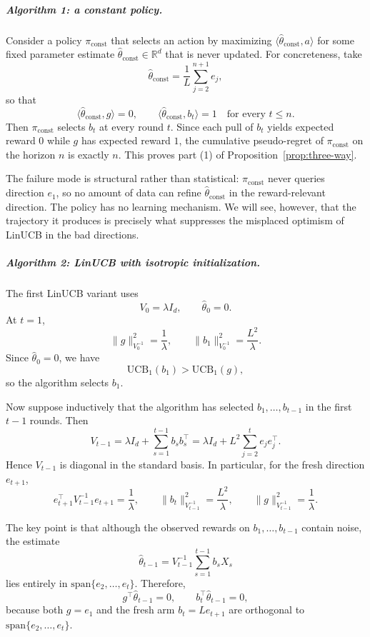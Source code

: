 \documentclass{article}
\theoremstyle{definition}
\theoremstyle{remark}
\theoremstyle{remark}
\begin{document}
\subparagraph{Algorithm 1: a constant policy.}
Consider a policy $\pi_{\mathrm{const}}$ that selects an action by maximizing $\langle \hat{\theta}_{\mathrm{const}}, a\rangle$ for some fixed parameter estimate $\hat{\theta}_{\mathrm{const}}\in\mathbb{R}^d$ that is never updated. For concreteness, take
\[
\hat{\theta}_{\mathrm{const}}
=
\frac{1}{L}\sum_{j=2}^{n+1} e_j,
\]
so that
\[
\langle \hat{\theta}_{\mathrm{const}},g\rangle = 0,
\qquad
\langle \hat{\theta}_{\mathrm{const}},b_t\rangle = 1
\quad\text{for every } t\le n.
\]
Then $\pi_{\mathrm{const}}$ selects $b_t$ at every round $t$. Since each pull of $b_t$ yields expected reward $0$ while $g$ has expected reward $1$, the cumulative pseudo-regret of $\pi_{\mathrm{const}}$ on the horizon $n$ is exactly $n$. This proves part (1) of Proposition~\ref{prop:three-way}.

The failure mode is structural rather than statistical: $\pi_{\mathrm{const}}$ never queries direction $e_1$, so no amount of data can refine $\hat{\theta}_{\mathrm{const}}$ in the reward-relevant direction. The policy has no learning mechanism. We will see, however, that the trajectory it produces is precisely what suppresses the misplaced optimism of LinUCB in the bad directions.

\subparagraph{Algorithm 2: LinUCB with isotropic initialization.}
The first LinUCB variant uses
\[
V_0=\lambda I_d,
\qquad
\hat{\theta}_0=0.
\]
At $t=1$,
\[
\|g\|_{V_0^{-1}}^2=\frac{1}{\lambda},
\qquad
\|b_1\|_{V_0^{-1}}^2=\frac{L^2}{\lambda}.
\]
Since $\hat{\theta}_0=0$, we have
\[
\mathrm{UCB}_1(b_1)>\mathrm{UCB}_1(g),
\]
so the algorithm selects $b_1$.

Now suppose inductively that the algorithm has selected $b_1,\dots,b_{t-1}$ in the first $t-1$ rounds. Then
\[
V_{t-1}
=
\lambda I_d+\sum_{s=1}^{t-1} b_s b_s^\top
=
\lambda I_d + L^2\sum_{j=2}^{t} e_j e_j^\top.
\]
Hence $V_{t-1}$ is diagonal in the standard basis. In particular, for the fresh direction $e_{t+1}$,
\[
e_{t+1}^\top V_{t-1}^{-1} e_{t+1}=\frac{1}{\lambda},
\qquad
\|b_t\|_{V_{t-1}^{-1}}^2=\frac{L^2}{\lambda},
\qquad
\|g\|_{V_{t-1}^{-1}}^2=\frac{1}{\lambda}.
\]

The key point is that although the observed rewards on $b_1,\dots,b_{t-1}$ contain noise, the estimate
\[
\hat{\theta}_{t-1}
=
V_{t-1}^{-1}\sum_{s=1}^{t-1} b_s X_s
\]
lies entirely in $\mathrm{span}\{e_2,\dots,e_t\}$. Therefore,
\[
g^\top \hat{\theta}_{t-1}=0,
\qquad
b_t^\top \hat{\theta}_{t-1}=0,
\]
because both $g=e_1$ and the fresh arm $b_t=L e_{t+1}$ are orthogonal to $\mathrm{span}\{e_2,\dots,e_t\}$.
\end{document}
